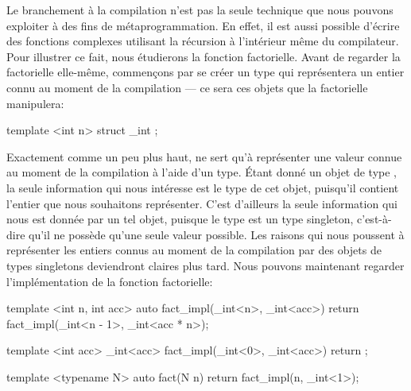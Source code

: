 Le branchement à la compilation n'est pas la seule technique que nous pouvons
exploiter à des fins de métaprogrammation. En effet, il est aussi possible
d'écrire des fonctions complexes utilisant la récursion à l'intérieur même du
compilateur. Pour illustrer ce fait, nous étudierons la fonction factorielle.
Avant de regarder la factorielle elle-même, commençons par se créer un type
qui représentera un entier connu au moment de la compilation --- ce sera ces
objets que la factorielle manipulera:
\begin{cpp}
    template <int n>
    struct _int { };
\end{cpp}

Exactement comme  un peu plus haut,  ne sert qu'à
représenter une valeur connue au moment de la compilation à l'aide d'un type.
Étant donné un objet de type , la seule information qui nous
intéresse est le type de cet objet, puisqu'il contient l'entier que nous
souhaitons représenter. C'est d'ailleurs la seule information qui nous est
donnée par un tel objet, puisque le type  est un type singleton,
c'est-à-dire qu'il ne possède qu'une seule valeur possible. Les raisons qui
nous poussent à représenter les entiers connus au moment de la compilation
par des objets de types singletons deviendront claires plus tard. Nous pouvons
maintenant regarder l'implémentation de la fonction factorielle:
\begin{cpp}
    template <int n, int acc>
    auto fact_impl(_int<n>, _int<acc>)
    { return fact_impl(_int<n - 1>{}, _int<acc * n>{}); }

    template <int acc>
    _int<acc> fact_impl(_int<0>, _int<acc>)
    { return {}; }

    template <typename N>
    auto fact(N n)
    { return fact_impl(n, _int<1>{}); }
\end{cpp}

